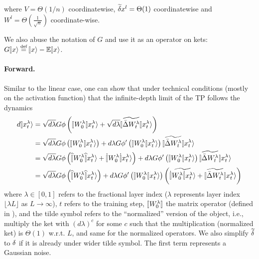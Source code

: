 \documentclass{article}
\theoremstyle{plain}
\theoremstyle{definition}
\begin{document}
where $V=\Theta(1/n)$ coordinatewise, $\widetilde{\delta} x^{l}=\Theta(1)$ coordinatewise
and $W^{l}=\Theta(\frac{1}{\sqrt{n}})$ coordinate-wise. 

We also abuse the notation of $G$ and use it as an operator on kets: $G\ket x\odefeq \ket x - \E\ket x$. 

\paragraph{Forward.} Similar to the linear case, one can show that under technical conditions (mostly on the activation function) that the infinite-depth limit of the TP follows the dynamics
\begin{align*}
d\ket{x_{t}^{\lambda}} & =\sqrt{d\lambda}G\phi\left(\oplim{W_{0}^{\lambda}}x_{t}^{\lambda}\ra+\sqrt{d\lambda}\oplim{\widetilde{\bar{\Delta}W_{t}^{\lambda}}}x_{t}^{\lambda}\ra\right)\\
 & =\sqrt{d\lambda}G\phi\left(\oplim{W_{0}^{\lambda}}x_{t}^{\lambda}\ra\right)+d\lambda G\phi'\left(\oplim{W_{0}^{\lambda}}x_{t}^{\lambda}\ra\right)\oplim{\widetilde{\bar{\Delta}W_{t}^{\lambda}}}x_{t}^{\lambda}\ra\\
 & =\sqrt{d\lambda}G\phi\left(\hatoplim{W_{0}^{\lambda}}x_{t}^{\lambda}\ra+\dotoplim{W_{0}^{\lambda}}x_{t}^{\lambda}\ra\right)+d\lambda G\phi'\left(\oplim{W_{0}^{\lambda}}x_{t}^{\lambda}\ra\right)\oplim{\widetilde{\bar{\Delta}W_{t}^{\lambda}}}x_{t}^{\lambda}\ra\\
 & =\sqrt{d\lambda}G\phi\left(\hatoplim{W_{0}^{\lambda}}x_{t}^{\lambda}\ra\right)+d\lambda G\phi'\left(\oplim{W_{0}^{\lambda}}x_{t}^{\lambda}\ra\right)\left(\widetilde{\dotoplim{W_{0}^{\lambda}}x_{t}^{\lambda}\ra}+\oplim{\widetilde{\bar{\Delta}W_{t}^{\lambda}}}x_{t}^{\lambda}\ra\right)
\end{align*}
where $\lambda \in [0,1]$ refers to the fractional layer index ($\lambda$ represents layer index $\lfloor \lambda L\rfloor$ as $L\to \infty$), $t$ refers to the training step, $\oplim{W_{0}^{\lambda}}$ the matrix operator (defined in ), and the tilde symbol refers to the ``normalized'' version of the object, i.e., multiply the ket with $(d\lambda)^c$ for some $c$ such that the multiplication (normalized ket) is $\Theta(1)$ w.r.t. $L$, and same for the normalized operators. We also simplify $\widetilde {\delta}$ to $\delta$ if it is already under wider tilde symbol. The first term represents a Gaussian noise.\\
\end{document}

